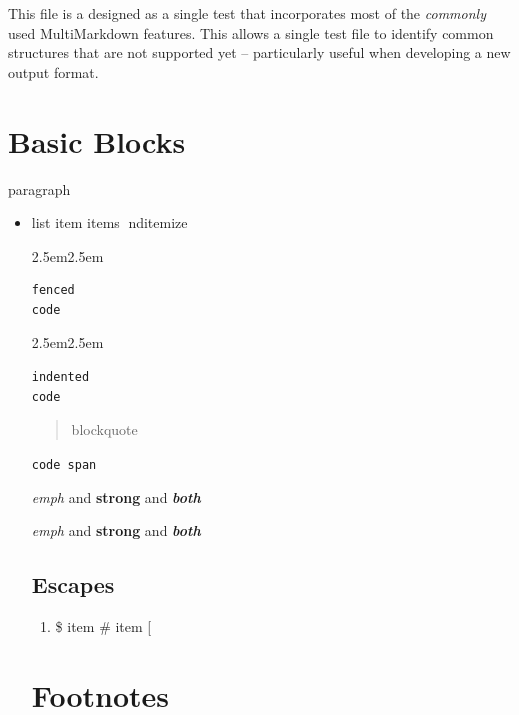 
\def\mytitle{Integrated}



This file is a designed as a single test that incorporates most of the
\emph{commonly} used MultiMarkdown features. This allows a single test file to
identify common structures that are not supported yet -- particularly useful
when developing a new output format.

\part{Basic Blocks}
\label{basicblocks}

paragraph

\begin{itemize}
\item list
item items
nd{itemize}

\begin{adjustwidth}{2.5em}{2.5em}
\begin{verbatim}
fenced
code
\end{verbatim}
\end{adjustwidth}

\begin{adjustwidth}{2.5em}{2.5em}\begin{verbatim}
indented
code
\end{verbatim}
\end{adjustwidth}

\begin{quote}
blockquote
\end{quote}

\texttt{code span}

\emph{emph} and \textbf{strong} and \textbf{\emph{both}}

\emph{emph} and \textbf{strong} and \textbf{\emph{both}}

\chapter{Escapes}
\label{escaped}

\begin{enumerate}
\item \$
item \#
item [
\end{enumerate}

\part{Footnotes}
\label{footnotes}


\end{itemize}
